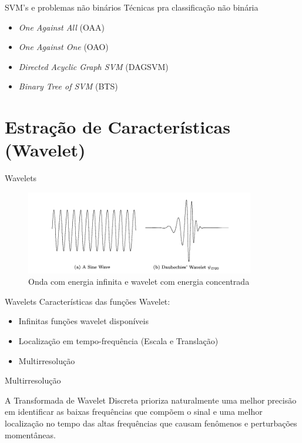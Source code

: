 \documentclass[10pt]{beamer}
\begin{document}
\begin{frame}{SVM's e problemas não binários}
  Técnicas pra classificação não binária
  \begin{itemize}
    \item \textit{One Against All} (OAA)
    \item \textit{One Against One} (OAO)
    \item \textit{Directed Acyclic Graph SVM} (DAGSVM)
    \item \textit{Binary Tree of SVM} (BTS)
  \end{itemize}

\end{frame}

\section*{Estração de Características (Wavelet)}


\begin{frame} {Wavelets}
  \begin{figure}[]
    \centering
    \includegraphics[width=10cm]{images/waveAndWavelet.png}
    \caption{Onda com energia infinita e wavelet com energia concentrada \cite{burrus_introduction_1998}}
  \end{figure}
\end{frame}

\begin{frame} {Wavelets}
  Características das funções Wavelet:
  \begin{itemize}
    \item Infinitas funções wavelet disponíveis
    \item Localização em tempo-frequência (Escala e Translação)
    \item Multirresolução
  \end{itemize}
\end{frame}

\begin{frame}{Multirresolução}

  A Transformada de Wavelet Discreta prioriza naturalmente uma melhor precisão em identificar 
  as baixas frequências que compõem o sinal e uma melhor localização no tempo das altas 
  frequências que causam fenômenos e perturbações momentâneas. \cite{strang_wavelets_1996}

\end{frame}
\end{document}
